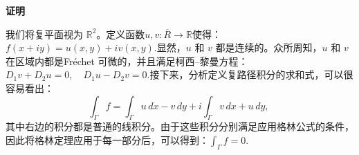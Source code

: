 \textbf{证明}

我们将复平面视为 $\mathbb{R}^2$。定义函数$u, v : \overline{R} \to \mathbb{R}$使得：$f(x + iy) = u(x, y) + i v(x, y)$.显然，$u$ 和 $v$ 都是连续的。众所周知，$u$ 和 $v$ 在区域内都是Fréchet 可微的，并且满足柯西–黎曼方程：$D_1 v + D_2 u = 0, \quad D_1 u - D_2 v = 0$.接下来，分析定义复路径积分的求和式，可以很容易看出：
$$
\int_{\Gamma} f 
= \int_{\Gamma} u \, dx - v \, dy
+ i \int_{\Gamma} v \, dx + u \, dy,~
$$
其中右边的积分都是普通的线积分。由于这些积分分别满足应用格林公式的条件，因此将格林定理应用于每一部分后，可以得到：$\int_{\Gamma} f = 0$.
